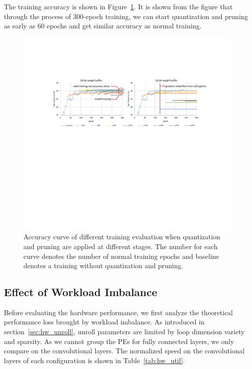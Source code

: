 The training accuracy is shown in Figure~\ref{fig:fixed_train_exp}. It is shown from the figure that through the process of 300-epoch training, we can start quantization and pruning as early as 60 epochs and get similar accuracy as normal training. 

\begin{figure}[tb]
  \centering
  \includegraphics[width=1.0\columnwidth]{figures/fixed_train_exp.pdf}
  \caption{Accuracy curve of different training evaluation when quantization and pruning are applied at different stages. The number for each curve denotes the number of normal training epochs and baseline denotes a training without quantization and pruning. }
  \label{fig:fixed_train_exp}
\end{figure}



\subsection{Effect of Workload Imbalance}\label{sec:exp:imb}

Before evaluating the hardware performance, we first analyze the theoretical performance loss brought by workload imbalance. As introduced in section~\ref{sec:hw_unroll}, unroll parameters are limited by loop dimension variety and sparsity. As we cannot group the PEs for fully connected layers, we only compare on the convolutional layers. The normalized speed on the convolutional layers of each configuration is shown in Table~\ref{tab:hw_util}.

